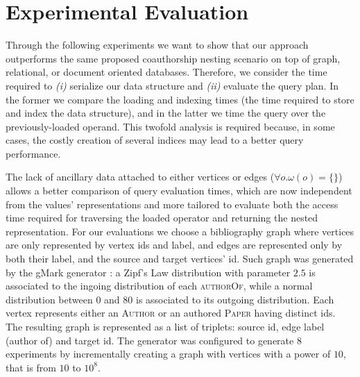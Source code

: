 \section{Experimental  Evaluation}\label{sec:nestexpeval}
Through the following experiments we want to show that our approach outperforms the same proposed coauthorship nesting scenario  on top of graph, relational, or document oriented databases. Therefore, we consider the time required to \textit{(i)}  serialize our data structure and \textit{(ii)} evaluate the query plan. In the former we compare the loading and indexing times (the time required to store and index the data structure), and in the latter  we time the query  over the previously-loaded operand. This twofold analysis is required because, in some cases, the costly creation of several indices may lead to a better query performance.

The lack of ancillary data attached to either vertices or edges ($\forall o. \omega(o)=\{\}$) allows a better comparison of query evaluation times, which are now independent from the values' representations and more tailored to evaluate both the  access time required for traversing the loaded operator and returning the nested representation.
For our evaluations we choose a bibliography graph where vertices are only represented by  vertex ids and  label, and edges are represented only by both their label, and the source and target vertices' id. Such graph was generated by the gMark generator \cite{BBCFLA17}: a Zipf's Law distribution with parameter $2.5$ is associated to the ingoing distribution  of each \textsc{authorOf}, while a normal distribution between $0$ and $80$ is associated to its outgoing distribution. Each vertex represents either an \textsc{Author} or an authored \textsc{Paper} having distinct ids. The resulting graph is represented as a list of triplets: source id, edge label (author of) and target id. The generator was configured to generate $8$ experiments by incrementally creating a graph with vertices with a power of $10$, that is from $10$ to $10^8$. 


